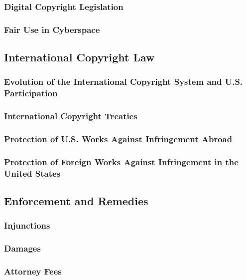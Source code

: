 \subsubsection{Digital Copyright Legislation}


\subsubsection{Fair Use in Cyberspace}


\subsection{International Copyright Law}

\subsubsection{Evolution of the International Copyright System and U.S. 
Participation}


\subsubsection{International Copyright Treaties}


\subsubsection{Protection of U.S. Works Against Infringement Abroad}


\subsubsection{Protection of Foreign Works Against Infringement in the United 
States}


\subsection{Enforcement and Remedies}

\subsubsection{Injunctions}


\subsubsection{Damages}


\subsubsection{Attorney Fees}

